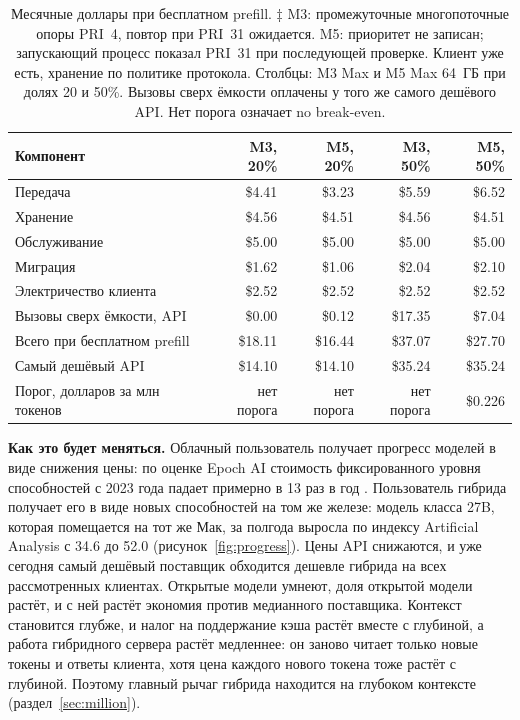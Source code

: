 \begin{table}[t]
\centering
\caption{Месячные доллары при бесплатном prefill. ‡ M3: промежуточные многопоточные опоры PRI~4, повтор при PRI~31 ожидается. M5: приоритет не записан; запускающий процесс показал PRI~31 при последующей проверке. Клиент уже есть, хранение по политике протокола. Столбцы: M3 Max и M5 Max 64~ГБ при долях 20 и 50\%. Вызовы сверх ёмкости оплачены у того же самого дешёвого API. Нет порога означает no break-even.}
\label{tab:breakeven}
\scriptsize
\begin{tabular}{lrrrr}
\toprule
Компонент & M3, 20\% & M5, 20\% & M3, 50\% & M5, 50\% \\
\midrule
Передача & \$4.41 & \$3.23 & \$5.59 & \$6.52 \\
Хранение & \$4.56 & \$4.51 & \$4.56 & \$4.51 \\
Обслуживание & \$5.00 & \$5.00 & \$5.00 & \$5.00 \\
Миграция & \$1.62 & \$1.06 & \$2.04 & \$2.10 \\
Электричество клиента & \$2.52 & \$2.52 & \$2.52 & \$2.52 \\
Вызовы сверх ёмкости, API & \$0.00 & \$0.12 & \$17.35 & \$7.04 \\
Всего при бесплатном prefill & \$18.11 & \$16.44 & \$37.07 & \$27.70 \\
Самый дешёвый API & \$14.10 & \$14.10 & \$35.24 & \$35.24 \\
Порог, долларов за млн токенов & нет порога & нет порога & нет порога & \$0.226 \\
\bottomrule
\end{tabular}
\end{table}

\textbf{Как это будет меняться.} Облачный пользователь получает прогресс моделей в виде снижения цены: по оценке
Epoch AI стоимость фиксированного уровня способностей с 2023 года падает примерно в 13 раз в год
\cite{epoch2026price}. Пользователь гибрида получает его в виде новых способностей на том же железе: модель класса 27B,
которая помещается на тот же Мак, за полгода выросла по индексу Artificial Analysis с 34.6 до 52.0 \cite{aaindex}
(рисунок~\ref{fig:progress}). Цены API снижаются, и уже сегодня самый дешёвый поставщик обходится дешевле гибрида на всех
рассмотренных клиентах. Открытые модели умнеют, доля открытой модели растёт, и с ней растёт экономия против медианного
поставщика. Контекст становится глубже, и налог на поддержание кэша растёт вместе с глубиной, а работа гибридного
сервера растёт медленнее: он заново читает только новые токены и ответы клиента, хотя цена каждого нового токена тоже
растёт с глубиной. Поэтому главный рычаг гибрида находится на глубоком контексте
(раздел~\ref{sec:million}).


